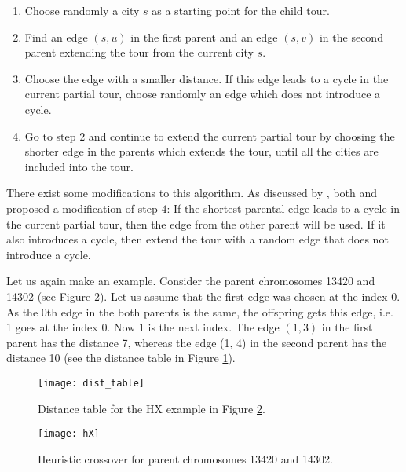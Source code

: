 \begin{enumerate}
	\item Choose randomly a city $s$ as a starting point for the child tour.
	\item Find an edge $(s, u)$ in the first parent and an edge $(s, v)$ in the second parent extending the tour from the current city $s$.
	\item Choose the edge with a smaller distance. If this edge leads to a cycle in the current partial tour, choose randomly an edge which does not introduce a cycle.
	 \item Go to step $2$ and continue to extend the current partial tour by choosing the shorter edge in the parents which extends the tour, until all the cities are included into the tour.	 
\end{enumerate}

 There exist some modifications to this algorithm. As discussed by \citeauthor{potvin1996genetic} \cite{potvin1996genetic}, both \citeauthor{liepins1987greedy} \cite{liepins1987greedy} and \citeauthor{suh1987incorporating} \cite{suh1987incorporating} proposed a modification of step $4$:
If the shortest parental edge leads to a cycle in the current partial tour, then the edge from the other parent will be used. If it also introduces a cycle, then extend the tour with a random edge that does not introduce a cycle. 

Let us again make an example. Consider the parent chromosomes 13420 and 14302 (see Figure \ref{hX}). Let us assume that the first edge was chosen at the index 0. As the 0th edge in the both parents is the same, the offspring gets this edge, i.e. 1 goes at the index 0. Now 1 is the next index. The edge $(1, 3)$ in the first parent has the distance 7, whereas the edge (1, 4) in the second parent has the distance 10 (see the distance table in Figure \ref{dist_table}). 

 \begin{figure}[htp] \centering
	\centering
	\texttt{[image: dist\_table]}
	\caption{Distance table for the HX example in Figure \ref{hX}.}
	\label{dist_table}
\end{figure}

\begin{figure}[htp] \centering
	\centering
	\texttt{[image: hX]}
	\caption{Heuristic crossover for parent chromosomes 13420 and 14302.}
	\label{hX}
\end{figure}


